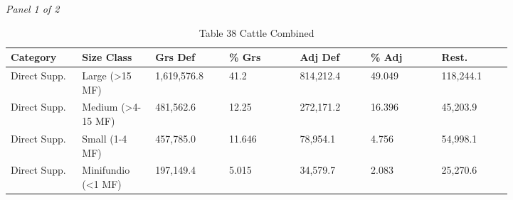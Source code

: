 \documentclass[12pt]{article}
\begin{document}
\begin{landscape}
\begin{table}[H]
\centering
\caption{Table 38 Cattle Combined}
\textit{Panel 1 of 2}\\[2pt]
{\fontsize{12}{14}\selectfont
\setlength{\tabcolsep}{3pt}
\renewcommand{\arraystretch}{1.08}
\begin{tabular}{p{0.117\linewidth}p{0.117\linewidth}p{0.117\linewidth}p{0.117\linewidth}p{0.117\linewidth}p{0.117\linewidth}p{0.117\linewidth}}
\toprule
Category & Size Class & Grs Def & \% Grs & Adj Def & \% Adj & Rest. \\
\midrule
Direct Supp. & Large (>15 MF) & 1,619,576.8 & 41.2 & 814,212.4 & 49.049 & 118,244.1 \\
Direct Supp. & Medium (>4-15 MF) & 481,562.6 & 12.25 & 272,171.2 & 16.396 & 45,203.9 \\
Direct Supp. & Small (1-4 MF) & 457,785.0 & 11.646 & 78,954.1 & 4.756 & 54,998.1 \\
Direct Supp. & Minifundio (<1 MF) & 197,149.4 & 5.015 & 34,579.7 & 2.083 & 25,270.6 \\
\bottomrule
\end{tabular}
}

\vspace{0.6em}


\end{table}
\end{landscape}
\end{document}
